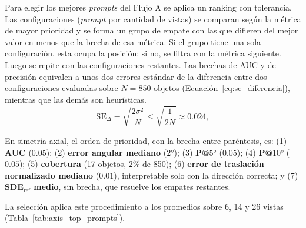 Para elegir los mejores \textit{prompts} del Flujo A se aplica un ranking con tolerancia. Las configuraciones (\textit{prompt} por cantidad de vistas) se comparan según la métrica de mayor prioridad y se forma un grupo de empate con las que difieren del mejor valor en menos que la brecha de esa métrica. Si el grupo tiene una sola configuración, esta ocupa la posición; si no, se filtra con la métrica siguiente. Luego se repite con las configuraciones restantes. Las brechas de AUC y de precisión equivalen a unos dos errores estándar de la diferencia entre dos configuraciones evaluadas sobre $N=850$ objetos (Ecuación~\eqref{eq:se_diferencia}), mientras que las demás son heurísticas.
{\color{revcolor}
\begin{equation}
\label{eq:se_diferencia}
\mathrm{SE}_{\Delta} = \sqrt{\frac{2\sigma^2}{N}} \leq \sqrt{\frac{1}{2N}} \approx 0.024 ,
\end{equation}
}

En simetría axial, el orden de prioridad, con la brecha entre paréntesis, es: (1) \textbf{AUC} ($0.05$); (2) \textbf{error angular mediano} ($2°$); (3) \textbf{P@$5°$} ($0.05$); (4) \textbf{P@$10°$} ($0.05$); (5) \textbf{cobertura} (17 objetos, 2\% de 850); (6) \textbf{error de traslación normalizado mediano} ($0.01$), interpretable solo con la dirección correcta; y (7) \textbf{SDE$_{\mathrm{ref}}$ medio}, sin brecha, que resuelve los empates restantes.

La selección aplica este procedimiento a los promedios sobre 6, 14 y 26 vistas (Tabla~\ref{tab:axis_top_prompts}). 

